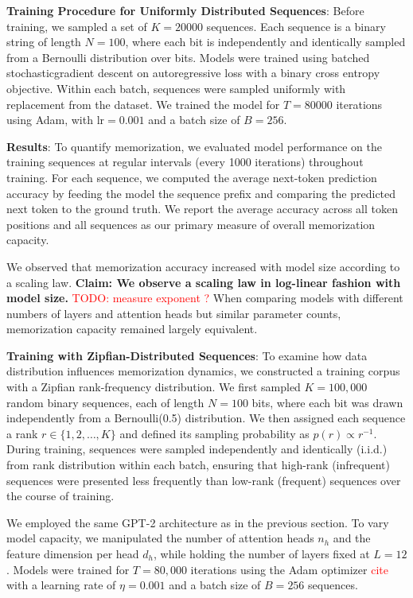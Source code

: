 \documentclass{article}
\theoremstyle{plain}
\theoremstyle{definition}
\theoremstyle{remark}
\begin{document}
\textbf{Training Procedure for Uniformly Distributed Sequences}:
Before training, we sampled a set of $K=20000$ sequences. Each 
sequence is a binary string of length $N=100$, where each bit is independently and identically sampled
 from a Bernoulli distribution over bits. 
Models were trained using batched stochasticgradient descent on autoregressive loss 
with a binary cross entropy objective.
 Within each batch, sequences were sampled uniformly with replacement from the dataset.
 We trained the model for $T=80000$ iterations using Adam, with $\text{lr}=0.001$ and a batch size of $B=256$.

\textbf{Results}: 
To quantify memorization, we evaluated model performance on the training sequences 
at regular intervals (every 1000 iterations) throughout training. 
For each sequence, we computed the average next-token prediction accuracy 
by feeding the model the sequence prefix and comparing the predicted next token to the ground truth. 
We report the average accuracy across all token positions and all sequences as our primary measure of overall memorization capacity. 

We observed that memorization accuracy increased with model size according to a scaling law. 
\textbf{Claim: We observe a scaling law in log-linear fashion with model size.} 
\textcolor{red}{TODO: measure exponent ?}
When comparing models with different numbers of layers and attention heads but similar parameter counts, 
 memorization capacity remained largely equivalent.

\textbf{Training with Zipfian-Distributed Sequences}:
To examine how data distribution influences memorization dynamics, 
we constructed a training corpus with a Zipfian rank-frequency distribution. 
We first sampled $K=100{,}000$ random binary sequences, each of length $N=100$ bits, 
where each bit was drawn independently from a Bernoulli(0.5) distribution.
 We then assigned each sequence a rank $r \in \{1, 2, \ldots, K\}$ and 
 defined its sampling probability as $p(r) \propto r^{-1}$.
  During training, sequences were sampled independently and identically (i.i.d.) from 
  rank distribution within each batch, 
  ensuring that high-rank (infrequent) sequences were presented less frequently than low-rank
   (frequent) sequences over the course of training.

We employed the same GPT-2  architecture as in the previous section. 
To vary model capacity, we manipulated the number of attention heads $n_h$ and the feature dimension per head $d_h$, 
while holding the number of layers fixed at $L=12$. 
 Models were trained for $T=80{,}000$ iterations using the Adam optimizer \textcolor{red}{cite}
  with a learning rate of $\eta=0.001$ and a batch size of $B=256$ sequences.
\end{document}
